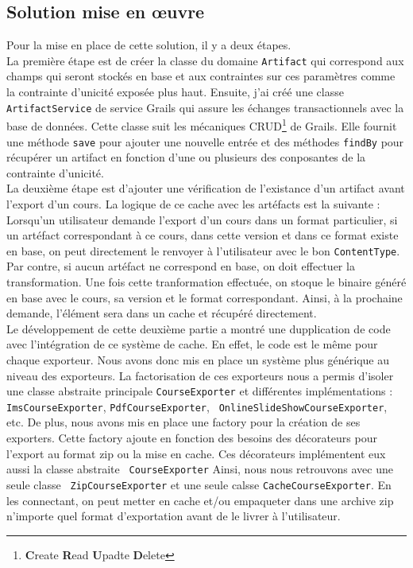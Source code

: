 \subsection{Solution mise en \oe uvre}
Pour la mise en place de cette solution, il y a deux étapes.\\

La première étape est de créer la classe du domaine {\tt Artifact} qui
correspond aux champs qui seront stockés en base et aux contraintes sur ces
paramètres comme la contrainte d'unicité exposée plus haut. Ensuite, j'ai créé
une classe {\tt ArtifactService} de service Grails qui assure les échanges
transactionnels avec la base de données. Cette classe suit les mécaniques
CRUD\footnote{{\bf C}reate {\bf R}ead {\bf U}padte {\bf D}elete} de
Grails. Elle fournit une méthode {\tt save} pour ajouter une nouvelle entrée et
des méthodes {\tt findBy} pour récupérer un artifact en fonction d'une ou
plusieurs des conposantes de la contrainte d'unicité.\\

La deuxième étape est d'ajouter une vérification de l'existance d'un artifact
avant l'export d'un cours. La logique de ce cache avec les artéfacts est la
suivante : Lorsqu'un utilisateur demande l'export d'un cours dans un format
particulier, si un artéfact correspondant à ce cours, dans cette version et dans
ce format existe en base, on peut directement le renvoyer à l'utilisateur avec
le bon {\tt ContentType}. Par contre, si aucun artéfact ne correspond en base,
on doit effectuer la transformation. Une fois cette tranformation effectuée, on
stoque le binaire généré en base avec le cours, sa version et le format
correspondant. Ainsi, à la prochaine demande, l'élément sera dans un \og cache
\fg{} et récupéré directement.\\

Le développement de cette deuxième partie a montré une dupplication de code avec
l'intégration de ce système de cache. En effet, le code est le même pour chaque
exporteur. Nous avons donc mis en place un système plus générique au niveau des
exporteurs. La factorisation de ces exporteurs nous a permis d'isoler une classe
abstraite principale {\tt CourseExporter} et différentes implémentations : {\tt
ImsCourseExporter}, {\tt PdfCourseExporter}, {\tt
OnlineSlideShowCourseExporter}, etc. De plus, nous avons mis en place une \og
factory \fg{} pour la création de ses exporters. Cette factory ajoute en
fonction des besoins des décorateurs pour l'export au format zip ou la mise en
cache. Ces décorateurs implémentent eux aussi la classe abstraite {\tt
CourseExporter} Ainsi, nous nous retrouvons avec une seule classe {\tt
ZipCourseExporter} et une seule calsse {\tt CacheCourseExporter}. En les
connectant, on peut metter en cache et/ou empaqueter dans une archive zip
n'importe quel format d'exportation avant de le livrer à l'utilisateur.

